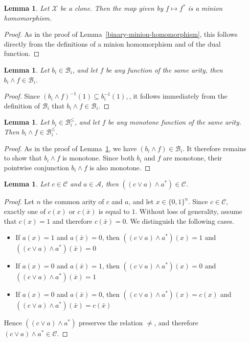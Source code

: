 \documentclass{amsart}
\numberwithin{equation}{section}
\theoremstyle{plain}
\newtheorem{lemma}[theorem]{Lemma}
\theoremstyle{definition}
\def\clone#1{\mathcal{#1}}
\def\Bc{\clone{B}}
\def\Ac{\clone{A}}
\def\Cc{\clone{C}}
\begin{document}
\begin{lemma}
  \label{dual-minion-homomorphism}
Let $\clone{X}$ be a clone. Then the map given by $f\mapsto f^*$ is a minion homomorphism.
\end{lemma}
\begin{proof}
As in the proof of Lemma~\ref{binary-minion-homomorphism}, this follows directly from the definitions of a minion homomorphism and of the dual function.
\end{proof}

\begin{lemma}
\label{bi-mensi}
  Let $b_i\in \Bc_i$, and let $f$ be any function of the same arity, then $b_i\wedge f \in \Bc_i$. 
\end{lemma}
\begin{proof}
Since $(b_i\wedge f)^{-1}(1)\subseteq b_i^{-1}(1),$, it follows immediately from the definition of $\Bc_i$ that $b_i\wedge f\in\Bc_i.$
\end{proof}

\begin{lemma}
\label{bi-less-mensi}
  Let $b_i\in \Bc_i^\leq$, and let $f$ be any monotone function of the same arity. Then $b_i\wedge f \in \Bc_i^\leq$. 
\end{lemma}
\begin{proof}
As in the proof of Lemma~\ref{bi-mensi}, we have $(b_i\wedge f)\in \Bc_i.$ It therefore remains to show that $b_i\wedge f$ is monotone. Since both $b_i$ and $f$ are monotone, their pointwise conjunction $b_i\wedge f$ is also monotone. 
\end{proof}

\begin{lemma}
  \label{c-mensi}
Let $c\in \Cc$ and $a\in \Ac$, then $((c\vee a)\wedge a^*)\in \Cc$.
\end{lemma}
\begin{proof}
  Let $n$ the common arity of $c$ and $a$, and let $x\in \{0,1\}^n$. Since $c\in\Cc$, exactly one of $c(x)$ or $c(\bar{x})$ is equal to $1$. Without loss of generality, assume that $c(x)=1$ and therefore $c(\bar{x})=0$. We distinguish the following cases.
  \begin{itemize}
  \item If $a(x) = 1$ and $a(\bar{x}) = 0$, then $((c\vee a)\wedge a^*) (x) = 1$ and $((c\vee a)\wedge a^*) (\bar{x}) = 0$
  \item If $a(x) = 0$ and $a(\bar{x}) = 1$, then $((c\vee a)\wedge a^*) (x) = 0$ and $((c\vee a)\wedge a^*) (\bar{x}) = 1$
  \item If $a(x) = 0$ and $a(\bar{x}) = 0$, then $((c\vee a)\wedge a^*) (x) = c(x)$ and $((c\vee a)\wedge a^*) (\bar{x}) = c(\bar{x})$
  \end{itemize}
  Hence $((c\vee a)\wedge a^*)$ preserves the relation $\neq$, and therefore $(c\vee a)\wedge a^* \in \Cc$.
\end{proof}
\end{document}
